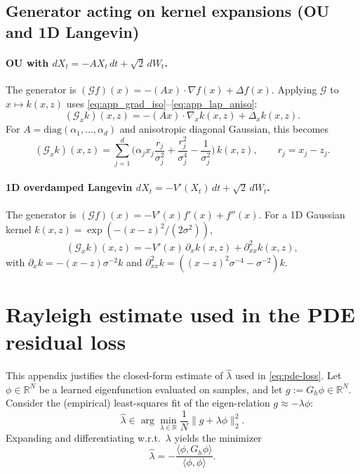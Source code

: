 \documentclass[11pt]{article}
\theoremstyle{remark}
\begin{document}
\subsection{Generator acting on kernel expansions (OU and 1D Langevin)}
\label{app:generator-on-kernels}

\paragraph{OU with $dX_t=-A X_t\,dt + \sqrt{2}\,dW_t$.}
The generator is $(\mathcal{G}f)(x)=-(Ax)\cdot\nabla f(x)+\Delta f(x)$.
Applying $\mathcal{G}$ to $x\mapsto k(x,z)$ uses \eqref{eq:app_grad_iso}--\eqref{eq:app_lap_aniso}:
\begin{equation}
(\mathcal{G}_x k)(x,z)
=
-(Ax)\cdot \nabla_x k(x,z) + \Delta_x k(x,z).
\label{eq:app_ou_generator_kernel}
\end{equation}
For $A=\mathrm{diag}(\alpha_1,\dots,\alpha_d)$ and anisotropic diagonal Gaussian, this becomes
\[
(\mathcal{G}_x k)(x,z)
=
\sum_{j=1}^d \Big(
\alpha_j x_j \frac{r_j}{\sigma_j^2}
+
\frac{r_j^2}{\sigma_j^4}-\frac{1}{\sigma_j^2}
\Big)\,k(x,z),
\qquad r_j=x_j-z_j.
\]

\paragraph{1D overdamped Langevin $dX_t=-V'(X_t)\,dt+\sqrt{2}\,dW_t$.}
The generator is $(\mathcal{G}f)(x)=-V'(x)f'(x)+f''(x)$.
For a 1D Gaussian kernel $k(x,z)=\exp(-(x-z)^2/(2\sigma^2))$,
\[
(\mathcal{G}_x k)(x,z)
=
- V'(x)\,\partial_x k(x,z) + \partial_{xx}^2 k(x,z),
\]
with $\partial_x k=-(x-z)\sigma^{-2}k$ and $\partial_{xx}^2 k=((x-z)^2\sigma^{-4}-\sigma^{-2})k$.

\section{Rayleigh estimate used in the PDE residual loss}
\label{app:pde:rayleigh}

This appendix justifies the closed-form estimate of $\widehat{\lambda}$ used in \eqref{eq:pde-loss}.
Let $\phi\in\mathbb{R}^N$ be a learned eigenfunction evaluated on samples, and let $g:=G_h\phi\in\mathbb{R}^N$.
Consider the (empirical) least-squares fit of the eigen-relation $g \approx -\lambda \phi$:
\begin{equation}
\widehat{\lambda}
\in
\arg\min_{\lambda\in\mathbb{R}}
\frac1N\|g+\lambda \phi\|_2^2.
\label{eq:app_rayleigh_ls}
\end{equation}
Expanding and differentiating w.r.t.\ $\lambda$ yields the minimizer
\begin{equation}
\widehat{\lambda}
=
-\frac{\langle \phi, G_h\phi\rangle}{\langle \phi,\phi\rangle}.
\label{eq:app_rayleigh_closed}
\end{equation}
\end{document}
